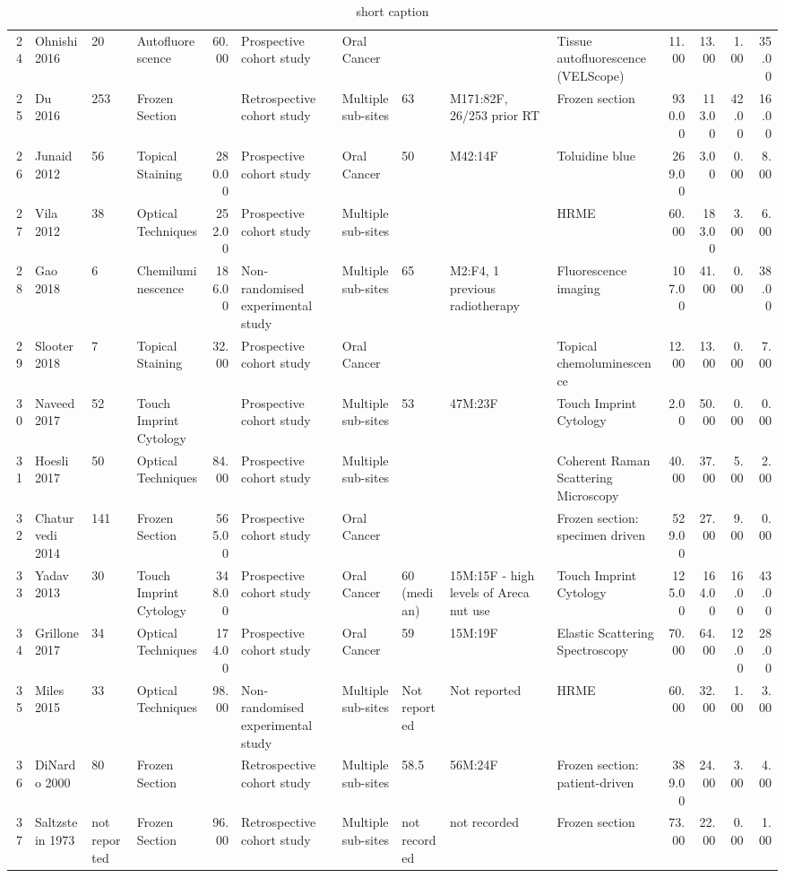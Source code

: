 \begin{table}[ht]
\begin{tabular}{rlllrlllllrrrr}
  24 & Ohnishi 2016 & 20 & Autofluorescence & 60.00 & Prospective cohort study & Oral Cancer &  &  & Tissue autofluorescence (VELScope) & 11.00 & 13.00 & 1.00 & 35.00 \\ 
  25 & Du 2016 & 253 & Frozen Section &  & Retrospective cohort study & Multiple sub-sites & 63 & M171:82F, 26/253 prior RT & Frozen section & 930.00 & 113.00 & 42.00 & 16.00 \\ 
  26 & Junaid 2012 & 56 & Topical Staining & 280.00 & Prospective cohort study & Oral Cancer & 50 & M42:14F & Toluidine blue & 269.00 & 3.00 & 0.00 & 8.00 \\ 
  27 & Vila 2012 & 38 & Optical Techniques & 252.00 & Prospective cohort study & Multiple sub-sites &  &  & HRME & 60.00 & 183.00 & 3.00 & 6.00 \\ 
  28 & Gao 2018 & 6 & Chemiluminescence & 186.00 & Non-randomised experimental study & Multiple sub-sites & 65 & M2:F4, 1 previous radiotherapy & Fluorescence imaging & 107.00 & 41.00 & 0.00 & 38.00 \\ 
  29 & Slooter 2018 & 7 & Topical Staining & 32.00 & Prospective cohort study & Oral Cancer &  &  & Topical chemoluminescence & 12.00 & 13.00 & 0.00 & 7.00 \\ 
  30 & Naveed 2017 & 52 & Touch Imprint Cytology &  & Prospective cohort study & Multiple sub-sites & 53 & 47M:23F & Touch Imprint Cytology & 2.00 & 50.00 & 0.00 & 0.00 \\ 
  31 & Hoesli 2017 & 50 & Optical Techniques & 84.00 & Prospective cohort study & Multiple sub-sites &  &  & Coherent Raman Scattering Microscopy & 40.00 & 37.00 & 5.00 & 2.00 \\ 
  32 & Chaturvedi 2014 & 141 & Frozen Section & 565.00 & Prospective cohort study & Oral Cancer &  &  & Frozen section: specimen driven & 529.00 & 27.00 & 9.00 & 0.00 \\ 
  33 & Yadav 2013 & 30 & Touch Imprint Cytology & 348.00 & Prospective cohort study & Oral Cancer & 60 (median) & 15M:15F - high levels of Areca nut use & Touch Imprint Cytology & 125.00 & 164.00 & 16.00 & 43.00 \\ 
  34 & Grillone 2017 & 34 & Optical Techniques & 174.00 & Prospective cohort study & Oral Cancer & 59 & 15M:19F & Elastic Scattering Spectroscopy & 70.00 & 64.00 & 12.00 & 28.00 \\ 
  35 & Miles 2015 & 33 & Optical Techniques & 98.00 & Non-randomised experimental study & Multiple sub-sites & Not reported & Not reported & HRME & 60.00 & 32.00 & 1.00 & 3.00 \\ 
  36 & DiNardo 2000 & 80 & Frozen Section &  & Retrospective cohort study & Multiple sub-sites & 58.5 & 56M:24F & Frozen section: patient-driven & 389.00 & 24.00 & 3.00 & 4.00 \\ 
  37 & Saltzstein 1973 & not reported & Frozen Section & 96.00 & Retrospective cohort study & Multiple sub-sites & not recorded & not recorded & Frozen section & 73.00 & 22.00 & 0.00 & 1.00 \\ 
   \hline
\end{tabular}
\endgroup
\caption[full caption]{short caption} 
\label{tab:study_details}
\end{table}
